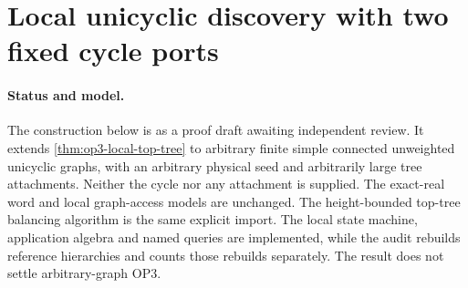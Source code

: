 \section[Local unicyclic construction]{Local unicyclic discovery with two fixed cycle ports}
\label{sec:op3-local-unicyclic}

\paragraph{Status and model.}
The construction below is \statusproved{} as a proof draft awaiting
independent review. It extends \cref{thm:op3-local-top-tree} to arbitrary
finite simple connected unweighted unicyclic graphs, with an arbitrary
physical seed and arbitrarily large tree attachments. Neither the cycle
nor any attachment is supplied. The exact-real word and local graph-access
models are unchanged. The height-bounded top-tree balancing algorithm is
the same explicit \statussource{} import. The local state machine,
application algebra and named queries are implemented, while the audit
rebuilds reference hierarchies and counts those rebuilds separately.
The result does not settle arbitrary-graph OP3.

